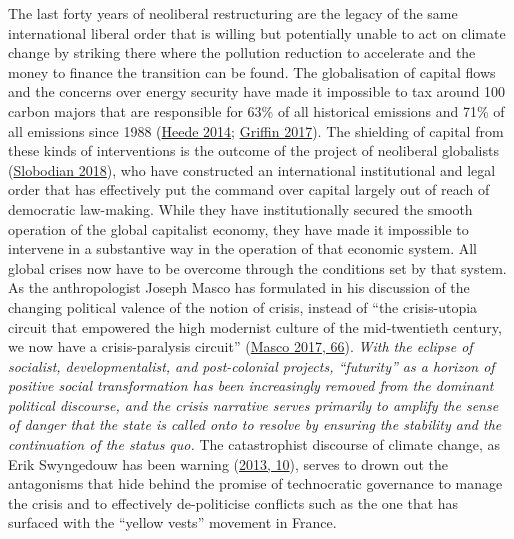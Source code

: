 \documentclass[a4paper, nobind]{templates/ociamthesis}
\begin{document}
The last forty years of neoliberal restructuring are the legacy of the same international liberal order that is willing but potentially unable to act on climate change by striking there where the pollution reduction to accelerate and the money to finance the transition can be found. The globalisation of capital flows and the concerns over energy security have made it impossible to tax around 100 carbon majors that are responsible for 63\% of all historical emissions and 71\% of all emissions since 1988 (\protect\hyperlink{ref-heede_tracing_2014}{Heede 2014}; \protect\hyperlink{ref-griffin_carbon_2017}{Griffin 2017}). The shielding of capital from these kinds of interventions is the outcome of the project of neoliberal globalists (\protect\hyperlink{ref-slobodian_globalists_2018}{Slobodian 2018}), who have constructed an international institutional and legal order that has effectively put the command over capital largely out of reach of democratic law-making. While they have institutionally secured the smooth operation of the global capitalist economy, they have made it impossible to intervene in a substantive way in the operation of that economic system. All global crises now have to be overcome through the conditions set by that system. As the anthropologist Joseph Masco has formulated in his discussion of the changing political valence of the notion of crisis, instead of ``the crisis-utopia circuit that empowered the high modernist culture of the mid-twentieth century, we now have a crisis-paralysis circuit'' (\protect\hyperlink{ref-masco_crisis_2017}{Masco 2017, 66}). \emph{With the eclipse of socialist, developmentalist, and post-colonial projects, ``futurity'' as a horizon of positive social transformation has been increasingly removed from the dominant political discourse, and the crisis narrative serves primarily to amplify the sense of danger that the state is called onto to resolve by ensuring the stability and the continuation of the status quo.} The catastrophist discourse of climate change, as Erik Swyngedouw has been warning (\protect\hyperlink{ref-swyngedouw_apocalypse_2013}{2013, 10}), serves to drown out the antagonisms that hide behind the promise of technocratic governance to manage the crisis and to effectively de-politicise conflicts such as the one that has surfaced with the ``yellow vests'' movement in France.
\end{document}
